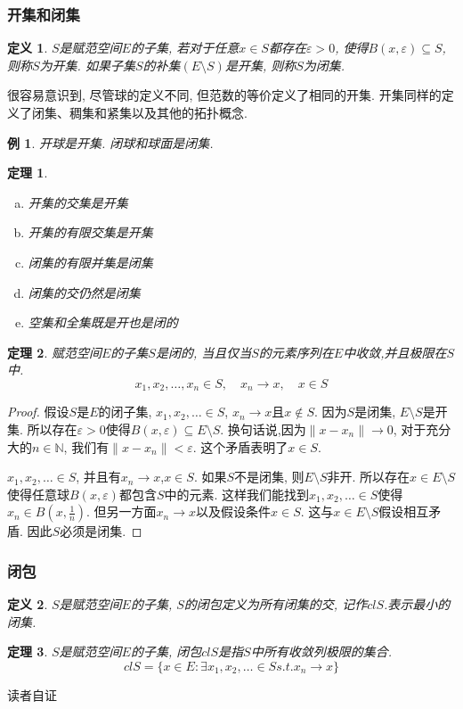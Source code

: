 \documentclass{book}
\newtheorem{definition}{\hspace{2em}定义}[section]
\newtheorem{theorem}{\hspace{2em}定理}[section]
\newtheorem{proof}{证明}[section]
\newtheorem{example}{例}[section]
\begin{document}
\subsubsection*{开集和闭集}
\begin{definition}
  $S$是赋范空间$E$的子集, 若对于任意$x\in S$都存在$\varepsilon>0$, 使得$B(x,\varepsilon)\subseteq S$,则称$S$为开集. 如果子集$S$的补集$(E\setminus S)$是开集, 则称$S$为闭集.
\end{definition}
很容易意识到, 尽管球的定义不同, 但范数的等价定义了相同的开集. 开集同样的定义了闭集、稠集和紧集以及其他的拓扑概念.
\begin{example}
  开球是开集. 闭球和球面是闭集.
\end{example}
\begin{theorem}
\begin{enumerate}[(a)]
  \item 开集的交集是开集
  \item 开集的有限交集是开集
  \item 闭集的有限并集是闭集
  \item 闭集的交仍然是闭集
  \item 空集和全集既是开也是闭的
\end{enumerate}
\end{theorem}
\begin{theorem}
  赋范空间$E$的子集$S$是闭的, 当且仅当$S$的元素序列在$E$中收敛,并且极限在$S$中.
  \begin{equation*}
    x_1,x_2,\dots,x_n\in S,\quad x_n\to x,\quad x\in S
  \end{equation*}
\end{theorem}
\begin{proof}
  假设$S$是$E$的闭子集, $x_1,x_2,\dots\in S$, $x_n\to x$且$x\notin S$. 因为$S$是闭集, $E\setminus S$是开集. 所以存在$\varepsilon>0$使得$B(x,\varepsilon)\subseteq E\setminus S$. 换句话说,因为$\|x-x_n\|\to 0$, 对于充分大的$n\in \mathbb{N}$, 我们有$\|x-x_n\|<\varepsilon$. 这个矛盾表明了$x\in S$.

  $x_1,x_2,\dots\in S$, 并且有$x_n\to x$,$x\in S$. 如果$S$不是闭集, 则$E\setminus S$非开. 所以存在$x\in E\setminus S$使得任意球$B(x,\varepsilon)$都包含$S$中的元素. 这样我们能找到$x_1,x_2,\dots\in S$使得$x_n\in B(x,\frac{1}{n})$. 但另一方面$x_n\to x$以及假设条件$x\in S$. 这与$x\in E\setminus S$假设相互矛盾. 因此$S$必须是闭集.
\end{proof}
\subsubsection*{闭包}
\begin{definition}
  $S$是赋范空间$E$的子集, $S$的闭包定义为所有闭集的交, 记作$cl S$.表示最小的闭集.
\end{definition}
\begin{theorem}
  $S$是赋范空间$E$的子集, 闭包$cl S$是指$S$中所有收敛列极限的集合.
  \begin{equation*}
    cl S=\{x\in E:\exists x_1,x_2,\dots\in S s.t. x_n\to x\}
  \end{equation*}
\end{theorem}
读者自证
\end{document}
